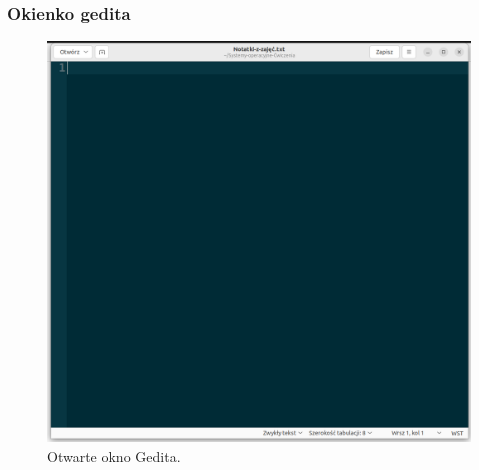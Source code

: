 \documentclass[10pt,t]{beamer}
\begin{document}
\begin{frame}
  \frametitle{Okienko gedita}


  \begin{figure}

    \centering

    \includegraphics[scale=0.18]
    {./Presentations-pictures/Miscancellous-pictures/gedit-window.png}

    \caption{Otwarte okno Gedita.}


    \label{fig:Gedit-window}

  \end{figure}

\end{frame}
\end{document}
